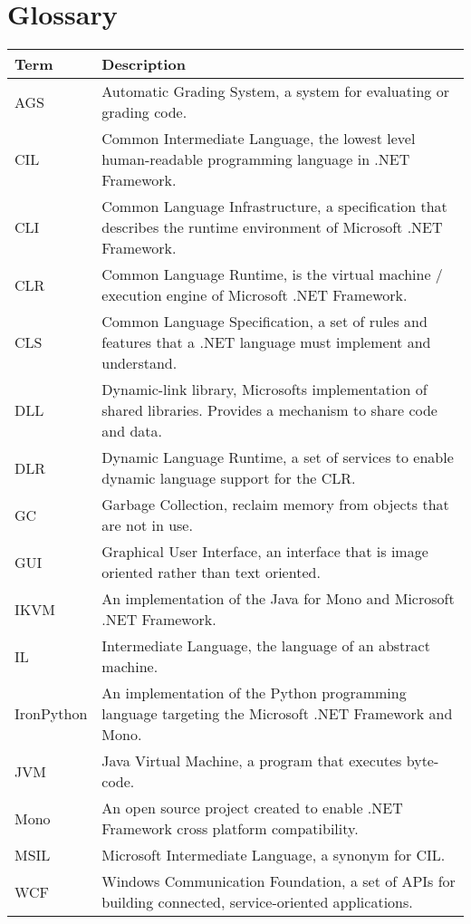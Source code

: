 \chapter*{Glossary}

\begin{center}
	\begin{tabular} { m{3cm} | m{11cm} }
		\hline
		\textbf{Term}	& \textbf{Description} \\ \hline
		AGS				& Automatic Grading System, a system for evaluating or grading code. \\ \hline
		CIL				& Common Intermediate Language, the lowest level human-readable programming language in .NET Framework. \\ \hline
		CLI				& Common Language Infrastructure, a specification that describes the runtime environment of Microsoft .NET Framework. \\ \hline
		CLR				& Common Language Runtime, is the virtual machine / execution engine of Microsoft .NET Framework. \\ \hline
		CLS				& Common Language Specification, a set of rules and features that a .NET language must implement and understand. \\ \hline
		DLL				& Dynamic-link library, Microsofts implementation of shared libraries. Provides a mechanism to share code and data. \\ \hline
		DLR				& Dynamic Language Runtime, a set of services to enable dynamic language support for the CLR. \\ \hline
		GC 				& Garbage Collection, reclaim memory from objects that are not in use. \\ \hline
		GUI				& Graphical User Interface, an interface that is image oriented rather than text oriented. \\ \hline
		IKVM			& An implementation of the Java for Mono and Microsoft .NET Framework. \\ \hline
		IL				& Intermediate Language, the language of an abstract machine. \\ \hline
		IronPython		& An implementation of the Python programming language targeting the Microsoft .NET Framework and Mono. \\ \hline
		JVM				& Java Virtual Machine, a program that executes byte-code. \\ \hline
		Mono			& An open source project created to enable .NET Framework cross platform compatibility. \\ \hline
		MSIL			& Microsoft Intermediate Language, a synonym for CIL. \\ \hline
		WCF				& Windows Communication Foundation, a set of APIs for building connected, service-oriented applications. \\ \hline
	\end{tabular}
\end{center}

